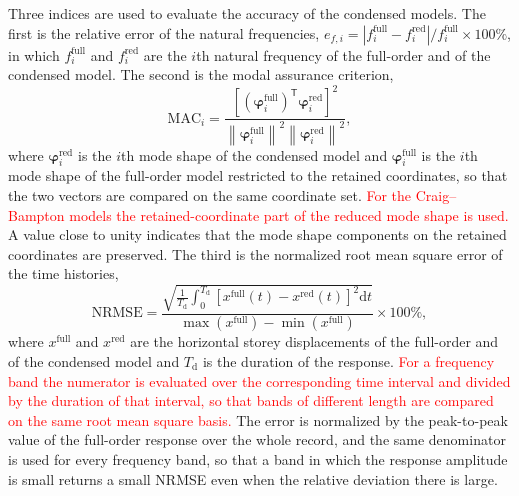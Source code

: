 \documentclass[11pt,a4paper]{article}
\numberwithin{equation}{section}
\newcommand{\rev}[1]{\textcolor{red}{#1}}
\begin{document}
Three indices are used to evaluate the accuracy of the condensed models. The first is the relative error of the natural frequencies, \(e_{f,i}=|f_{i}^{\mathrm{full}}-f_{i}^{\mathrm{red}}|/f_{i}^{\mathrm{full}}\times100\%\), in which \(f_{i}^{\mathrm{full}}\) and \(f_{i}^{\mathrm{red}}\) are the \(i\)th natural frequency of the full-order and of the condensed model. The second is the modal assurance criterion,
\begin{equation}
	\mathrm{MAC}_{i}=
	\frac{\left[\left(\bm{\varphi}_{i}^{\mathrm{full}}\right)^{\mathsf{T}}
		\bm{\varphi}_{i}^{\mathrm{red}}\right]^{2}}
	{\left\|\bm{\varphi}_{i}^{\mathrm{full}}\right\|^{2}
		\left\|\bm{\varphi}_{i}^{\mathrm{red}}\right\|^{2}},
	\label{eq:mac}
\end{equation}
where \(\bm{\varphi}_{i}^{\mathrm{red}}\) is the \(i\)th mode shape of the condensed model and \(\bm{\varphi}_{i}^{\mathrm{full}}\) is the \(i\)th mode shape of the full-order model restricted to the retained coordinates, so that the two vectors are compared on the same coordinate set. \rev{For the Craig--Bampton models the retained-coordinate part of the reduced mode shape is used.} A value close to unity indicates that the mode shape components on the retained coordinates are preserved. The third is the normalized root mean square error of the time histories,
\begin{equation}
	\mathrm{NRMSE}=
	\frac{\displaystyle\sqrt{\frac{1}{T_{\mathrm{d}}}\int_{0}^{T_{\mathrm{d}}}
			\left[x^{\mathrm{full}}(t)-x^{\mathrm{red}}(t)\right]^{2}\mathrm{d}t}}
	{\max\left(x^{\mathrm{full}}\right)-\min\left(x^{\mathrm{full}}\right)}
	\times100\%,
	\label{eq:nrmse}
\end{equation}
where \(x^{\mathrm{full}}\) and \(x^{\mathrm{red}}\) are the horizontal storey displacements of the full-order and of the condensed model and \(T_{\mathrm{d}}\) is the duration of the response. \rev{For a frequency band the numerator is evaluated over the corresponding time interval and divided by the duration of that interval, so that bands of different length are compared on the same root mean square basis.} The error is normalized by the peak-to-peak value of the full-order response over the whole record, and the same denominator is used for every frequency band, so that a band in which the response amplitude is small returns a small NRMSE even when the relative deviation there is large.
\end{document}
